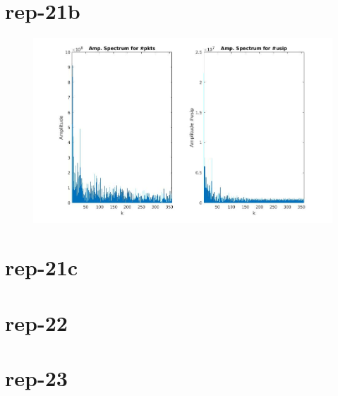 \section*{rep-21b}
\begin{figure}[H]
\center
\includegraphics[width=.7\textwidth]{./chapters/plots/rep21b.jpg}\\
\caption{}
\end{figure}

\section*{rep-21c}

\section*{rep-22}

\section*{rep-23}


